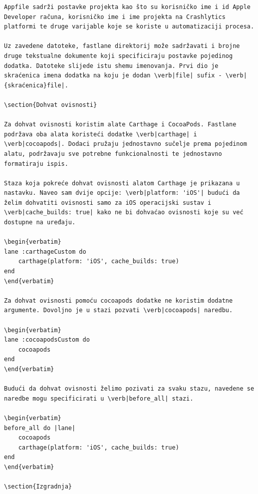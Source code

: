 \documentclass[times, utf8, diplomski, numeric]{fer}
\begin{document}
\begin{appendices}
\begin{lstlisting}[caption=Provjera postojanja i pokretanje Swiftlint alata, label=listing:swiftlint]
Appfile sadrži postavke projekta kao što su korisničko ime i id Apple Developer računa, korisničko ime i ime projekta na Crashlytics platformi te druge varijable koje se koriste u automatizaciji procesa.

Uz zavedene datoteke, fastlane direktorij može sadržavati i brojne druge tekstualne dokumente koji specificiraju postavke pojedinog dodatka. Datoteke slijede istu shemu imenovanja. Prvi dio je skraćenica imena dodatka na koju je dodan \verb|file| sufix - \verb|{skraćenica}file|.

\section{Dohvat ovisnosti}

Za dohvat ovisnosti koristim alate Carthage i CocoaPods. Fastlane podržava oba alata koristeći dodatke \verb|carthage| i \verb|cocoapods|. Dodaci pružaju jednostavno sučelje prema pojedinom alatu, podržavaju sve potrebne funkcionalnosti te jednostavno formatiraju ispis.

Staza koja pokreće dohvat ovisnosti alatom Carthage je prikazana u nastavku. Naveo sam dvije opcije: \verb|platform: 'iOS'| budući da želim dohvatiti ovisnosti samo za iOS operacijski sustav i \verb|cache_builds: true| kako ne bi dohvaćao ovisnosti koje su već dostupne na uređaju.

\begin{verbatim}
lane :carthageCustom do
    carthage(platform: 'iOS', cache_builds: true)
end
\end{verbatim}

Za dohvat ovisnosti pomoću cocoapods dodatke ne koristim dodatne argumente. Dovoljno je u stazi pozvati \verb|cocoapods| naredbu.

\begin{verbatim}
lane :cocoapodsCustom do
    cocoapods
end
\end{verbatim}

Budući da dohvat ovisnosti želimo pozivati za svaku stazu, navedene se naredbe mogu specificirati u \verb|before_all| stazi.

\begin{verbatim}
before_all do |lane|
    cocoapods
    carthage(platform: 'iOS', cache_builds: true)
end
\end{verbatim}

\section{Izgradnja}


\end{lstlisting}
\end{appendices}
\end{document}
